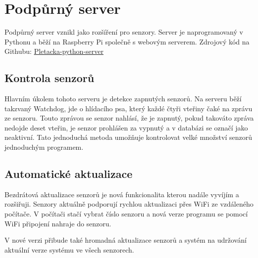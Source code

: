 \chapter{Podpůrný server}
Podpůrný server vznikl jako rozšíření pro senzory.
Server je naprogramovaný v Pythonu a běží na Raspberry Pi společně s webovým serverem.\newline
Zdrojový kód na Githubu: \href{https://github.com/Pletacka-IoT/Pletacka-python-server}{Pletacka-python-server} 


\section{Kontrola senzorů}
Hlavním úkolem tohoto serveru je detekce zapnutých senzorů.
Na serveru běží takzvaný Watchdog, jde o hlídacího psa, který každé čtyři vteřiny čaké na zprávu ze senzoru.
Touto zprávou se senzor nahlásí, že je zapnutý, pokud takováto zpráva nedojde deset vteřin, je senzor prohlášen za vypnutý a v databázi se označí jako neaktivní.
Tato jednoduchá metoda umožňuje kontrolovat velké množství senzorů jednoduchým programem.

\section{Automatické aktualizace}
Bezdrátová aktualizace senzorů je nová funkcionalita kterou nadále vyvíjím a rozšiřuji.
Senzory aktuálně podporují rychlou aktualizaci přes WiFi ze vzdáleného počítače.
V počítači stačí vybrat číslo senzoru a nová verze programu se pomocí WiFi připojení nahraje do senzoru.

V nové verzi přibude také hromadná aktualizace senzorů a systém na udržování aktuální verze systému ve všech senzorech.




\newpage